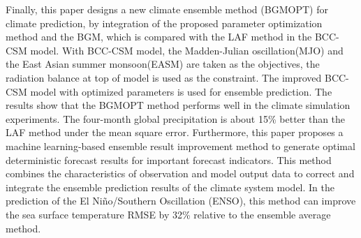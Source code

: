 \begin{eabstract}
Finally, this paper designs a new climate ensemble method (BGMOPT) for climate prediction, by integration of the proposed parameter optimization method and the BGM, which is compared with the LAF method in the BCC-CSM model. With BCC-CSM model, the Madden-Julian oscillation(MJO) and the East Asian summer monsoon(EASM) are taken as the objectives, the radiation balance at top of model is used as the constraint. The improved BCC-CSM model with optimized parameters is used for ensemble prediction. The results show that the BGMOPT method performs well in the climate simulation experiments. The four-month global precipitation is about 15\% better than the LAF method under the mean square error. Furthermore, this paper proposes a machine learning-based ensemble result improvement method to generate optimal deterministic forecast results for important forecast indicators. This method combines the characteristics of observation and model output data to correct and integrate the ensemble prediction results of the climate system model. In the prediction of the El Niño/Southern Oscillation (ENSO), this method can improve the sea surface temperature RMSE by 32\% relative to the ensemble average method.
\end{eabstract}

